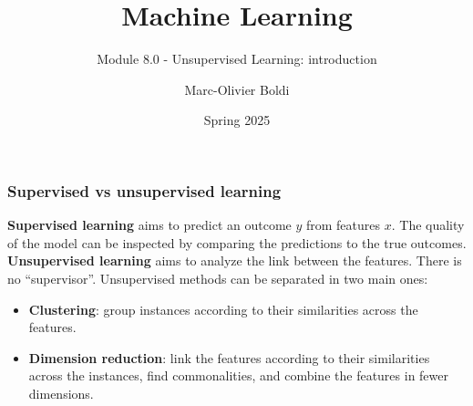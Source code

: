 
\title{Machine Learning}
\subtitle{Module 8.0 - Unsupervised Learning: introduction}
\author[MOB]{Marc-Olivier Boldi}
\date{Spring 2025}

\begin{frame}
  \titlepage
\end{frame}
\begin{frame}
\frametitle{Supervised vs unsupervised learning}
{\bf Supervised learning} aims to predict an outcome $y$ from features $x$. The quality of the model can be inspected by comparing the predictions to the true outcomes.\\
\vspace{0.3cm}
{\bf Unsupervised learning} aims to analyze the link between the features. There is no ``supervisor''. Unsupervised methods can be separated in two main ones:
\begin{itemize}
\item {\bf Clustering}: group instances according to their similarities across the features.
\item {\bf Dimension reduction}: link the features according to their similarities across the instances, find commonalities, and combine the features in fewer dimensions. 
\end{itemize}
\end{frame}
